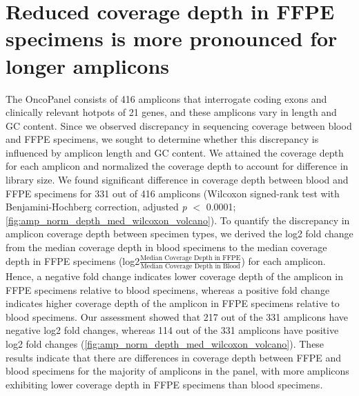 \section{Reduced coverage depth in FFPE specimens is more pronounced for longer amplicons}
\label{sec:ReducedcoveragedepthinFFPEspecimensismorepronouncedforlongeramplicons}

The OncoPanel consists of 416 amplicons that interrogate coding exons and clinically relevant hotpots of 21 genes, and these amplicons vary in length and GC content. Since we observed discrepancy in sequencing coverage between blood and FFPE specimens, we sought to determine whether this discrepancy is influenced by amplicon length and GC content. We attained the coverage depth for each amplicon and normalized the coverage depth to account for difference in library size. We found significant difference in coverage depth between blood and FFPE specimens for 331 out of 416 amplicons (Wilcoxon signed-rank test with Benjamini-Hochberg correction, adjusted \textit{p} $<$ 0.0001; \autoref{fig:amp_norm_depth_med_wilcoxon_volcano}). To quantify the discrepancy in amplicon coverage depth between specimen types, we derived the log2 fold change from the median coverage depth in blood specimens to the median coverage depth in FFPE specimens (log2\( \frac{\text{Median Coverage Depth in FFPE}}{\text{Median Coverage Depth in Blood}} \)) for each amplicon. Hence, a negative fold change indicates lower coverage depth of the amplicon in FFPE specimens relative to blood specimens, whereas a positive fold change indicates higher coverage depth of the amplicon in FFPE specimens relative to blood specimens. Our assessment showed that 217 out of the 331 amplicons have negative log2 fold changes, whereas 114 out of the 331 amplicons have positive log2 fold changes (\autoref{fig:amp_norm_depth_med_wilcoxon_volcano}). These results indicate that there are differences in coverage depth between FFPE and blood specimens for the majority of amplicons in the panel, with more amplicons exhibiting lower coverage depth in FFPE specimens than blood specimens.

